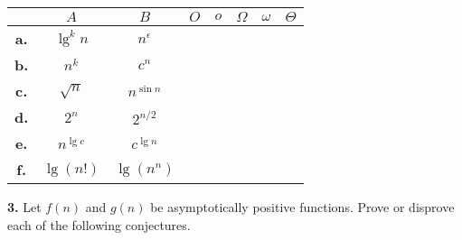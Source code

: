 \documentclass[addpoints]{exam}
\begin{document}
\begin{questions}
  \begin{table}[H]
    \centering
    \begin{tabular}{c | c c | c | c | c | c | c |}
                  & $A$           & $B$            & $O$ & $o$ & $\Omega$ & $\omega$ & $ \Theta $ \\ \hline
      \textbf{a.} & $ \lg^k n $   & $ n^\epsilon $ &     &     &          &          &            \\ \hline
      \textbf{b.} & $ n^k $       & $ c^n $        &     &     &          &          &            \\ \hline
      \textbf{c.} & $ \sqrt{n} $  & $ n^{\sin n} $ &     &     &          &          &            \\ \hline
      \textbf{d.} & $ 2^n $       & $ 2^{n/2} $    &     &     &          &          &            \\ \hline
      \textbf{e.} & $ n^{\lg c} $ & $ c^{\lg n} $  &     &     &          &          &            \\ \hline
      \textbf{f.} & $ \lg(n!) $   & $ \lg(n^n) $   &     &     &          &          &            \\ \hline
    \end{tabular}
  \end{table}

  \question
  \textbf{3. } Let $ f(n) $ and $ g(n) $ be asymptotically positive functions. Prove or disprove each of the following conjectures.

\end{questions}
\end{document}
